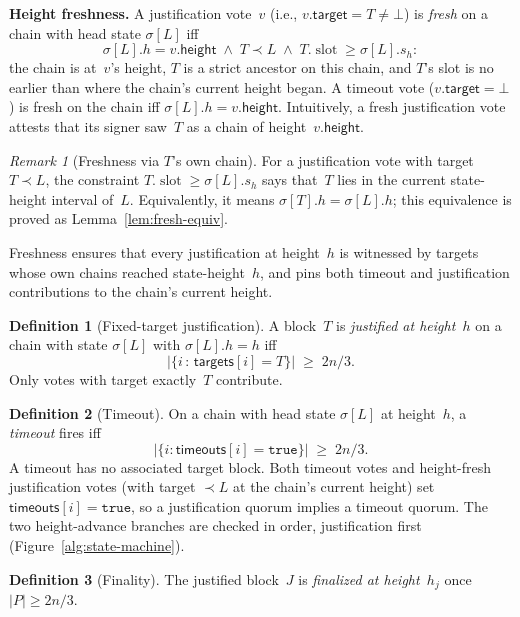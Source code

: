 \ifx\litemode\undefined\documentclass{article}\fi
\newcommand{\slot}[0]{\ensuremath{\operatorname{\mathrm{slot}}}}
\newcommand{\target}{\mathsf{target}}
\newcommand{\height}{\mathsf{height}}
\newcommand{\targets}{\mathsf{targets}}
\newcommand{\timeouts}{\mathsf{timeouts}}
\renewcommand{\paragraph}[1]{\vspace{7pt}\noindent\textbf{#1}}
\theoremstyle{plain}
\theoremstyle{definition}
\newtheorem{definition}{Definition}
\theoremstyle{remark}
\newtheorem{remark}[theorem]{Remark}
\begin{document}
\paragraph{Height freshness.}
A justification vote~$v$ (i.e., $v.\target = T \neq \bot$) is \emph{fresh} on a chain with head state $\sigma[L]$ iff
\[
  \sigma[L].h = v.\height \;\wedge\; T \prec L \;\wedge\; T.\slot \geq \sigma[L].s_h:
\]
the chain is at~$v$'s height, $T$ is a strict ancestor on this chain, and $T$'s slot is no earlier than where the chain's current height began.
A timeout vote ($v.\target = \bot$) is fresh on the chain iff $\sigma[L].h = v.\height$.
Intuitively, a fresh justification vote attests that its signer saw~$T$ as a chain of height~$v.\height$.

\begin{remark}[Freshness via $T$'s own chain]
For a justification vote with target $T \prec L$, the constraint $T.\slot \geq \sigma[L].s_h$ says that~$T$ lies in the current state-height interval of~$L$.
Equivalently, it means $\sigma[T].h = \sigma[L].h$; this equivalence is proved as Lemma~\ref{lem:fresh-equiv}.
\end{remark}

Freshness ensures that every justification at height~$h$ is witnessed by targets whose own chains reached state-height~$h$, and pins both timeout and justification contributions to the chain's current height.

\begin{definition}[Fixed-target justification]\label{def:justification}
A block~$T$ is \emph{justified at height~$h$} on a chain with state $\sigma[L]$ with $\sigma[L].h = h$ iff
\[
  \bigl|\{i \,:\, \targets[i] = T\}\bigr| \;\geq\; 2n/3.
\]
Only votes with target exactly~$T$ contribute.
\end{definition}

\begin{definition}[Timeout]\label{def:timeout}
On a chain with head state $\sigma[L]$ at height~$h$, a \emph{timeout} fires iff
\[
  \bigl|\{i : \timeouts[i] = \mathtt{true}\}\bigr| \;\geq\; 2n/3.
\]
A timeout has no associated target block.
Both timeout votes and height-fresh justification votes (with target $\prec L$ at the chain's current height) set $\timeouts[i] = \mathtt{true}$, so a justification quorum implies a timeout quorum.
The two height-advance branches are checked in order, justification first (Figure~\ref{alg:state-machine}).
\end{definition}

\begin{definition}[Finality]\label{def:finality}
The justified block~$J$ is \emph{finalized at height~$h_j$} once $|P| \geq 2n/3$.
\end{definition}
\end{document}

